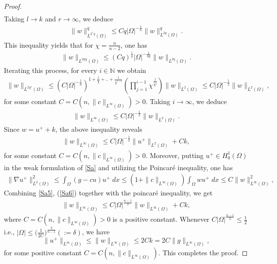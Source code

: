 \documentclass[10pt,a4paper]{amsart}
\begin{document}
\begin{proof}
\begin{align*}
\end{align*}
Taking $l\to k$ and $r\to\infty$, we deduce
\begin{align*}
    \|w\|_{L^{2^*q}(\Omega)}^q\leq Cq|\Omega|^{-\frac{1}{n}}\|w\|_{L^{2q}(\Omega)}^q.
\end{align*}
This inequality yields that for $\chi=\frac{n}{n-2}$, one has
\begin{align*}
    \|w\|_{L^{2q\chi}(\Omega)}\leq (Cq)^\frac{1}{q}|\Omega|^{-\frac{1}{nq}}\|w\|_{L^{2q}(\Omega)}.
\end{align*}
 Iterating this process, for every $i\in\mathbb{N}$ we obtain
\begin{align*}
    \|w\|_{L^{2\chi^i}(\Omega)}\leq (C|\Omega|^{-\frac{1}{n}})^{1+\frac{1}{\chi}+..+\frac{1}{\chi^{i-1}}}(\prod_{j=1}^{i-1} \chi^\frac{j}{\chi^j})\|w\|_{L^{2}(\Omega)}\leq C|\Omega|^{-\frac{1}{2}}\|w\|_{L^{2}(\Omega)},
\end{align*}
for some constant $C=C(n,\|c\|_{L^\infty(\Omega)})>0$. Taking $i\to\infty$, we deduce 
\begin{align*}
    \|w\|_{L^\infty(\Omega)}\leq C|\Omega|^{-\frac{1}{2}}\|w\|_{L^{2}(\Omega)}.
\end{align*}
Since $w=u^++k$, the above inequality reveals 
\begin{align}\label{Sa5}
    \|w\|_{L^\infty(\Omega)}\leq C|\Omega|^{-\frac{1}{2}}\|u^+\|_{L^2(\Omega)}+Ck,
\end{align}
for some constant $C=C(n,\|c\|_{L^\infty(\Omega)})>0$.
Moreover, putting $u^+\in H^1_0(\Omega)$ in the weak formulation of \eqref{Sa} and utilizing the Poincar\'{e} inequality, one has
\begin{align}\label{Sa6}
    \|\nabla u^+\|_{L^2(\Omega)}^2\leq \int_\Omega (g-cu)u^+\;dx\leq (1+\|c\|_{L^\infty(\Omega)})\int_\Omega wu^+\;dx\leq C\|w\|_{L^\infty(\Omega)}^2,
\end{align}
Combining \eqref{Sa5}, (\ref{Sa6}) together with the poincar\'{e} inequality, we get
\begin{align}\label{Sa7}
    \|w\|_{L^\infty(\Omega)}\leq C|\Omega|^{\frac{n-1}{2}}\|w\|_{L^\infty(\Omega)}+Ck,
\end{align}
where $C=C(n,\|c\|_{L^\infty(\Omega)})>0$ is a positive constant. Whenever $C|\Omega|^\frac{n-1}{2}\leq \frac{1}{2}$ i.e., $|\Omega|\leq \Big(\frac{1}{2C}\Big)^\frac{2}{n-1}(:=\delta)$, we have $$\|u^+\|_{L^\infty(\Omega)}\leq \|w\|_{L^\infty(\Omega)}\leq 2Ck=2C\|g\|_{L^\infty(\Omega)},$$
for some positive constant $C=C(n,\|c\|_{L^\infty(\Omega)}).$
This completes the proof.
\end{proof}
\end{document}

